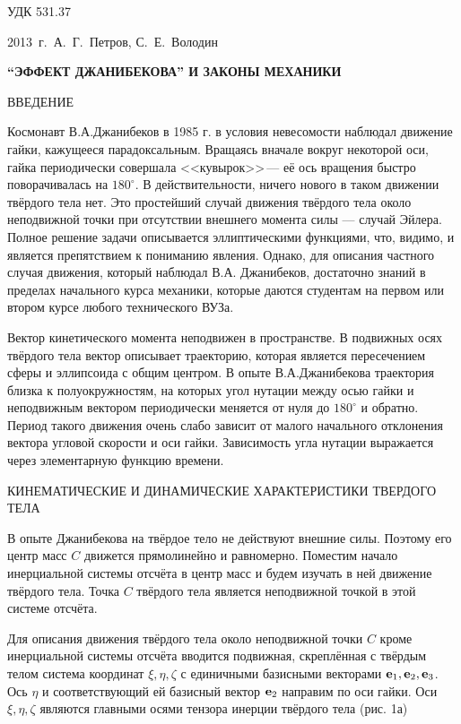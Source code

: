 \documentclass[14pt,a4paper]{extarticle}
\begin{document}
УДК 531.37

\smallskip


\centerline{2013~г.~{А.~Г.~Петров, С.~Е.~Володин}}

\smallskip

\centerline{\bf ``ЭФФЕКТ ДЖАНИБЕКОВА'' И ЗАКОНЫ МЕХАНИКИ}

\bigskip

ВВЕДЕНИЕ

Космонавт В.А.Джанибеков в 1985 г. в условия невесомости наблюдал  движение гайки, кажущееся парадоксальным. Вращаясь вначале вокруг некоторой оси, гайка периодически совершала <<кувырок>>\,--- её ось вращения быстро поворачивалась на $ 180^\circ$. В действительности, ничего нового в таком движении твёрдого тела нет. Это простейший случай движения твёрдого тела около неподвижной точки при отсутствии внешнего момента силы --- случай Эйлера. Полное решение задачи описывается эллиптическими функциями, что, видимо, и является препятствием к пониманию явления. Однако, для описания частного случая движения, который наблюдал В.А. Джанибеков, достаточно  знаний в пределах начального курса механики, которые даются студентам на первом или втором курсе любого технического ВУЗа.   

Вектор кинетического момента неподвижен в пространстве. В подвижных осях твёрдого тела вектор описывает траекторию, которая является пересечением сферы и эллипсоида с общим центром. В опыте В.А.Джанибекова траектория близка к полуокружностям, на которых угол нутации между осью гайки и неподвижным вектором периодически меняется от нуля до $180^\circ$ и обратно.  Период такого движения очень слабо зависит от малого начального отклонения вектора угловой скорости и оси гайки. Зависимость угла нутации выражается через элементарную функцию времени.  

КИНЕМАТИЧЕСКИЕ И ДИНАМИЧЕСКИЕ ХАРАКТЕРИСТИКИ ТВЕРДОГО ТЕЛА

В опыте Джанибекова на твёрдое тело не действуют внешние силы. Поэтому его центр масс $C$ движется прямолинейно и равномерно. Поместим начало инерциальной системы отсчёта в центр масс и будем изучать в ней движение твёрдого тела. Точка $C$ твёрдого тела является неподвижной  точкой в этой системе отсчёта.

Для описания движения твёрдого тела около неподвижной точки $C$ кроме инерциальной системы отсчёта вводится подвижная, скреплённая с твёрдым телом система координат $\xi,\eta,\zeta$ с единичными базисными векторами ${\bf e}_1,{\bf e}_2,{\bf e}_3$. Ось $\eta$ и соответствующий ей базисный вектор ${\bf e}_2$ направим по оси гайки. Оси $\xi,\eta,\zeta$ являются главными осями тензора инерции твёрдого тела (рис. 1а)
\end{document}
